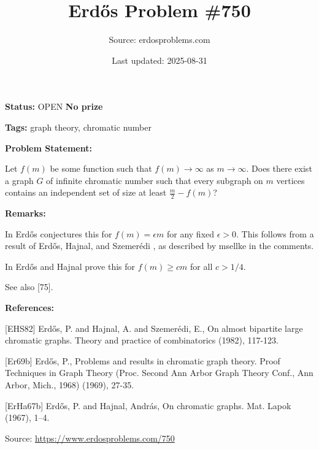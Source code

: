 \documentclass{article}
\title{Erd\H{o}s Problem \#750}
\date{Last updated: 2025-08-31}
\author{Source: erdosproblems.com}
\begin{document}
\maketitle

\noindent\textbf{Status:} OPEN \quad \textbf{No prize}

\noindent\textbf{Tags:} graph theory, chromatic number

\medskip
\noindent\textbf{Problem Statement:}

Let $f(m)$ be some function such that $f(m)\to \infty$ as $m\to \infty$. Does there exist a graph $G$ of infinite chromatic number such that every subgraph on $m$ vertices contains an independent set of size at least $\frac{m}{2}-f(m)$?

\bigskip
\noindent\textbf{Remarks:}

In \cite{Er69b} Erd\H{o}s conjectures this for $f(m)=\epsilon m$ for any fixed $\epsilon>0$. This follows from a result of Erd\H{o}s, Hajnal, and Szemer\'{e}di \cite{EHS82}, as described by msellke in the comments.

In \cite{ErHa67b} Erd\H{o}s and Hajnal prove this for $f(m)\geq cm$ for all $c>1/4$.

See also [75].

\bigskip
\noindent\textbf{References:}

[EHS82] Erd\H{o}s, P. and Hajnal, A. and Szemer\'{e}di, E., On almost bipartite large chromatic graphs. Theory and practice of combinatorics (1982), 117-123.
 
 [Er69b] Erd\H{o}s, P., Problems and results in chromatic graph theory. Proof Techniques in Graph Theory (Proc. Second Ann
Arbor Graph Theory Conf., Ann Arbor, Mich.,
1968) (1969), 27-35.
 
 [ErHa67b] Erd\H{o}s, P. and Hajnal, Andr\'{a}s, On chromatic graphs. Mat. Lapok (1967), 1--4.

\bigskip
\noindent\small{Source: \url{https://www.erdosproblems.com/750}}
\end{document}
